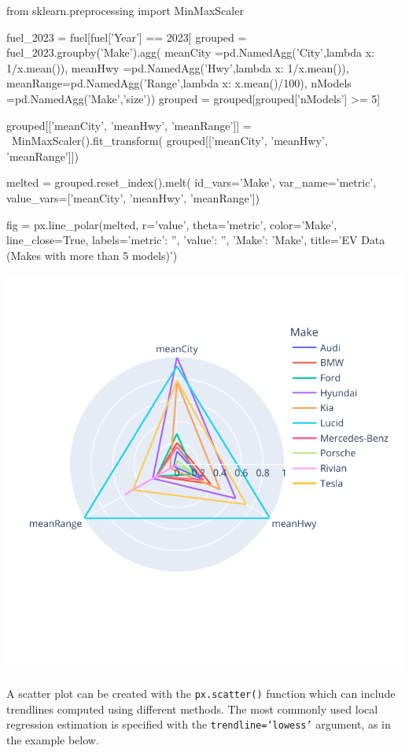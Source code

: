 \begin{samepage}
\begin{pythoncode}
from sklearn.preprocessing import MinMaxScaler

fuel_2023 = fuel[fuel['Year'] == 2023]
grouped = fuel_2023.groupby('Make').agg(
    meanCity =pd.NamedAgg('City',lambda x: 1/x.mean()),
    meanHwy  =pd.NamedAgg('Hwy',lambda x: 1/x.mean()),
    meanRange=pd.NamedAgg('Range',lambda x: x.mean()/100),
    nModels  =pd.NamedAgg('Make','size'))
grouped = grouped[grouped['nModels'] >= 5]

grouped[['meanCity', 'meanHwy', 'meanRange']] = \
   MinMaxScaler().fit_transform(
      grouped[['meanCity', 'meanHwy', 'meanRange']])

melted = grouped.reset_index().melt(
    id_vars='Make', var_name='metric',
    value_vars=['meanCity', 'meanHwy', 'meanRange'])

fig = px.line_polar(melted, 
     r='value', 
     theta='metric', 
     color='Make', 
     line_close=True,
     labels={'metric': '', 'value': '', 'Make': 'Make'},
     title='EV Data (Makes with more than 5 models)')
\end{pythoncode}
\end{samepage}

\begin{center}
  \includegraphics[width=.8\textwidth]{px.fuel.radar.pdf}
\end{center}

A scatter plot can be created with the \texttt{px.scatter()} function which can include trendlines computed using different methods. The most commonly used local regression estimation is specified with the \texttt{trendline='lowess'} argument, as in the example below.

